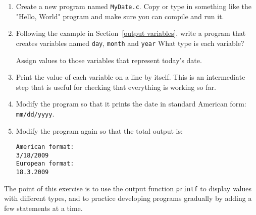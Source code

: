 
\begin{exercise}
\label{ex.date}

\begin{enumerate}

\item Create a new program named {\tt MyDate.c}.  Copy or
type in something like the "Hello, World" program and make
sure you can compile and run it.

\item Following the example in Section~\ref{output variables}, write a program
that creates variables named {\tt day}, {\tt month}
and {\tt year}
What type is each variable?

Assign values to those variables that represent today's date.

\item Print the value of each variable on a line by itself.  This is
an intermediate step that is useful for checking that everything is
working so far.

\item Modify the program so that it prints the date in standard
American form: {\tt {\tt mm/dd/yyyy}}.

\item Modify the program again so that the total output is:

\begin{verbatim}
American format:
3/18/2009
European format:
18.3.2009
\end{verbatim}

\end{enumerate}

The point of this exercise is to use the output function {\tt printf} to display
values with different types, and to
practice developing programs gradually by adding a few statements
at a time.



\end{exercise}


